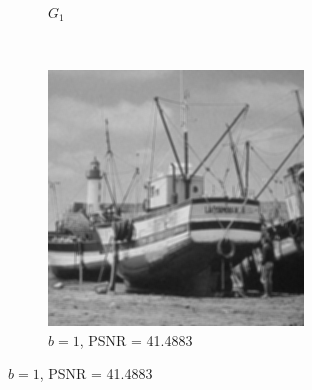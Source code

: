 \documentclass{article}
\begin{document}
\begin{enumerate}[label=(\alph*)]
\begin{figure}[!htb]
\begin{subfigure}[b]{0.3\textwidth}
            \caption{$G_1$}
        \end{subfigure}
        ~
        \begin{subfigure}[b]{0.3\textwidth}
            \includegraphics[width=\textwidth]{img/RG1.png}
            \caption{$b = 1$, PSNR = 41.4883}
        \end{subfigure}
                
        

\end{figure}
\end{enumerate}
\end{document}
